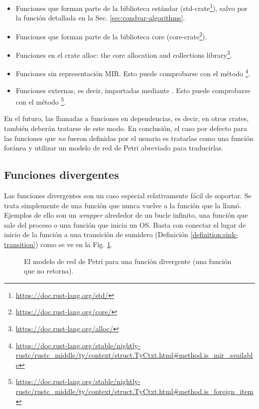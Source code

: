 \begin{itemize}
    \item Funciones que forman parte de la biblioteca estándar (std-crate\footnote{\url{https://doc.rust-lang.org/std/}}),
          salvo por la función  detallada en la Sec. \ref{sec:condvar-algorithms}.
    \item Funciones que forman parte de la biblioteca core (core-crate\footnote{\url{https://doc.rust-lang.org/core/}}).
    \item Funciones en el crate alloc: the core allocation and collections library\footnote{\url{https://doc.rust-lang.org/alloc/}}.
    \item Funciones sin representación \acrshort{MIR}.
          Esto puede comprobarse con el método
          \footnote{\url{https://doc.rust-lang.org/stable/nightly-rustc/rustc_middle/ty/context/struct.TyCtxt.html\#method.is\_mir\_available}}.
    \item Funciones externas, es decir, importadas mediante .
          Esto puede comprobarse con el método \footnote{\url{https://doc.rust-lang.org/stable/nightly-rustc/rustc_middle/ty/context/struct.TyCtxt.html\#method.is\_foreign\_item}}.
\end{itemize}

En el futuro, las llamadas a funciones en dependencias, es decir, en otros crates, también
deberán tratarse de este modo. En conclusión, el caso por defecto para las funciones que \emph{no}
fueron definidas por el usuario es tratarlas como una función foránea y utilizar un modelo de red
de Petri abreviado para traducirlas.

\subsection{Funciones divergentes}

Las funciones divergentes son un caso especial relativamente fácil de soportar. Se trata
simplemente de una función que nunca vuelve a la función que la llamó. Ejemplos de ello son un
\textit{wrapper} alrededor de un bucle  infinito, una función que sale del proceso o una función
que inicia un \acrshort{OS}. Basta con conectar el lugar de inicio de la función a una transición de
sumidero (Definición \ref{definition:sink-transition}) como se ve en la Fig. \ref{fig:diverging-function}.

\begin{figure}[!htb]
    \centering
    
    \caption{El modelo de red de Petri para una función divergente (una función que no retorna).}
    \label{fig:diverging-function}
\end{figure}

